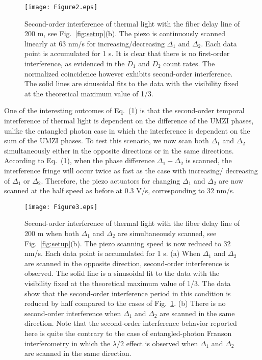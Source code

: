 \documentclass[aps,prl,reprint,showpacs,superscriptaddress]{revtex4-1}
\begin{document}
\begin{figure}[t]
\texttt{[image: Figure2.eps]}
\caption{Second-order interference of thermal light with the fiber delay line of 200 m, see Fig.~\ref{fig:setup}(b). The piezo is continuously scanned linearly at 63 nm/s for increasing/decreasing $\Delta_1$ and $\Delta_2$. Each data point is accumulated for 1 s. It is clear that there is no first-order interference, as evidenced in the $D_1$ and $D_2$ count rates. The normalized coincidence however exhibits second-order interference. The solid lines are sinusoidal fits to the data with the visibility fixed at the theoretical maximum value of 1/3.}\label{fig:single}
\end{figure}


One of the interesting outcomes  of Eq.~(1) is that  the second-order temporal interference of thermal light is dependent on the difference of the UMZI phases, unlike the entangled photon case in which the interference is dependent on the sum of the UMZI phases. To test this scenario, we now scan both $\Delta_1$ and $\Delta_2$ simultaneously either in the opposite directions or in the same directions. According to Eq.~(1), when the phase difference $\Delta_1-\Delta_2$ is scanned, the interference fringe will occur twice as fast as the case with increasing/ decreasing of $\Delta_1$ or $\Delta_2$. Therefore, the piezo actuators for changing $\Delta_1$ and $\Delta_2$ are now scanned at the half speed as before at 0.3 V/s, corresponding to  32 nm/s. 

\begin{figure}[t]
\texttt{[image: Figure3.eps]}
\caption{Second-order interference of thermal light with the fiber delay line of 200 m when both $\Delta_1$ and $\Delta_2$ are simultaneously scanned, see Fig.~\ref{fig:setup}(b). The piezo scanning speed is now reduced to 32 nm/s. Each data point is accumulated for 1 s. 
(a) When $\Delta_1$ and $\Delta_2$ are scanned in the opposite direction, second-order interference is observed. The solid line is a sinusoidal fit to the data with the visibility fixed at the theoretical maximum value of 1/3. The data show that the second-order interference period in this condition is reduced by half compared to the cases of Fig.~\ref{fig:single}.
(b) There is no second-order interference when $\Delta_1$ and $\Delta_2$ are scanned in the same direction. Note that the second-order interference behavior reported here is quite the contrary to the case of entangled-photon Franson interferometry in which the $\lambda/2$ effect is observed when $\Delta_1$ and $\Delta_2$ are scanned in the same direction.}\label{fig:both}
\end{figure}
\end{document}
